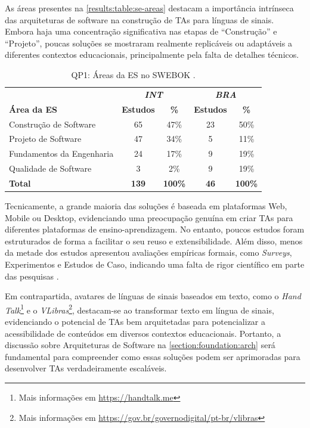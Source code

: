 As áreas presentes na \autoref{results:table:se-areas} destacam a importância intrínseca das arquiteturas de software na construção de TAs para línguas de sinais. Embora haja uma concentração significativa nas etapas de ``Construção'' e ``Projeto'', poucas soluções se mostraram realmente replicáveis ou adaptáveis a diferentes contextos educacionais, principalmente pela falta de detalhes técnicos.

\begin{table}[htb]
\caption{QP1: Áreas da ES no SWEBOK \cite{Bourque2014}.}
\label{results:table:se-areas}
\centering
\begin{tabular}{l|cc|cc} \hline
 & \multicolumn{2}{c|}{\textit{\textbf{INT}}} & \multicolumn{2}{c}{\textit{\textbf{BRA}}} \\ \cline{2-5} 
\textbf{Área da ES} & \textbf{Estudos} & \textbf{\%} & \textbf{Estudos} & \textbf{\%} \\ \hline
Construção de Software & 65 & 47\% & 23 & 50\% \\
Projeto de Software & 47 & 34\% & 5 & 11\% \\
Fundamentos da Engenharia & 24 & 17\% & 9 & 19\% \\
Qualidade de Software & 3 & 2\% & 9 & 19\% \\ \hline
\textbf{Total} & \textbf{139} & \textbf{100\%} & \textbf{46} & \textbf{100\%} \\ \hline
\end{tabular}
\end{table}

Tecnicamente, a grande maioria das soluções é baseada em plataformas Web, Mobile ou Desktop, evidenciando uma preocupação genuína em criar TAs para diferentes plataformas de ensino-aprendizagem. No entanto, poucos estudos foram estruturados de forma a facilitar o seu reuso e extensibilidade. Além disso, menos da metade dos estudos apresentou avaliações empíricas formais, como \textit{Surveys}, Experimentos e Estudos de Caso, indicando uma falta de rigor científico em parte das pesquisas \cite{Pressman2016, Sommerville2015}.

Em contrapartida, avatares de línguas de sinais baseados em texto, como o \textit{Hand Talk}\footnote{Mais informações em \url{https://handtalk.me}} e o \textit{VLibras}\footnote{Mais informações em \url{https://gov.br/governodigital/pt-br/vlibras}}, destacam-se ao transformar texto em língua de sinais, evidenciando o potencial de TAs bem arquitetadas para potencializar a acessibilidade de conteúdos em diversos contextos educacionais. Portanto, a discussão sobre Arquiteturas de Software na \autoref{section:foundation:arch} será fundamental para compreender como essas soluções podem ser aprimoradas para desenvolver TAs verdadeiramente escaláveis.

